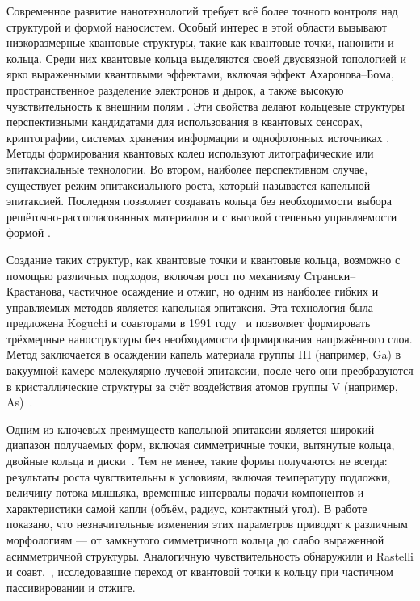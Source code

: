 \documentclass[14pt,oneside]{extarticle}
\begin{document}


\tableofcontents
\pagebreak


Современное развитие нанотехнологий требует всё более точного контроля над структурой и формой наносистем. Особый интерес в этой области вызывают низкоразмерные квантовые структуры, такие как квантовые точки, нанонити и кольца. Среди них квантовые кольца выделяются своей двусвязной топологией и ярко выраженными квантовыми эффектами, включая эффект Ахаронова–Бома, пространственное разделение электронов и дырок, а также высокую чувствительность к внешним полям \cite{Li2009, Beo2020}. Эти свойства делают кольцевые структуры перспективными кандидатами для использования в квантовых сенсорах, криптографии, системах хранения информации и однофотонных источниках \cite{Gurioli2001, Liu2019}. Методы формирования квантовых колец используют литографические или эпитаксиальные технологии. Во втором, наиболее перспективном случае, существует режим эпитаксиального роста, который называется капельной эпитаксией. Последняя позволяет создавать кольца без необходимости выбора решёточно-рассогласованных материалов и с высокой степенью управляемости формой \cite{Korytov2012, Nemcsics2011}.

Создание таких структур, как квантовые точки и квантовые кольца, возможно с помощью различных подходов, включая рост по механизму Странски–Крастанова, частичное осаждение и отжиг, но одним из наиболее гибких и управляемых методов является капельная эпитаксия. Эта технология была предложена Koguchi и соавторами в 1991 году~\cite{koguchi1991} и позволяет формировать трёхмерные наноструктуры без необходимости формирования напряжённого слоя. Метод заключается в осаждении капель материала группы III (например, Ga) в вакуумной камере молекулярно-лучевой эпитаксии, после чего они преобразуются в кристаллические структуры за счёт воздействия атомов группы V (например, As)~\cite{Korytov2012, Nemcsics2011}.

Одним из ключевых преимуществ капельной эпитаксии является широкий диапазон получаемых форм, включая симметричные точки, вытянутые кольца, двойные кольца и диски~\cite{Somaschini2011, Koguchi1991}. Тем не менее, такие формы получаются не всегда: результаты роста чувствительны к условиям, включая температуру подложки, величину потока мышьяка, временные интервалы подачи компонентов и характеристики самой капли (объём, радиус, контактный угол). В работе~\cite{zhou2013} показано, что незначительные изменения этих параметров приводят к различным морфологиям — от замкнутого симметричного кольца до слабо выраженной асимметричной структуры. Аналогичную чувствительность обнаружили и Rastelli и соавт.~\cite{rastelli2004}, исследовавшие переход от квантовой точки к кольцу при частичном пассивировании и отжиге.
\end{document}
